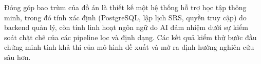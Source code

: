 \documentclass[../DoAn.tex]{subfiles}
\begin{document}
Đóng góp bao trùm của đồ án là thiết kế một hệ thống hỗ trợ học tập thông minh, trong đó tính xác định (PostgreSQL, lập lịch SRS, quyền truy cập) do backend quản lý, còn tính linh hoạt ngôn ngữ do AI đảm nhiệm dưới sự kiểm soát chặt chẽ của các pipeline lọc và định dạng. Các kết quả kiểm thử bước đầu chứng minh tính khả thi của mô hình đề xuất và mở ra định hướng nghiên cứu sâu hơn.
\end{document}
